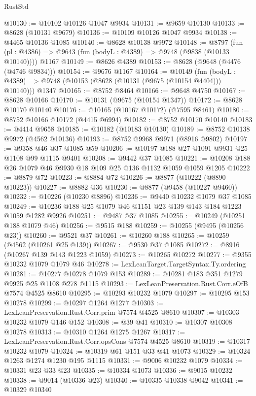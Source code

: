 \begin{lexlean}{RustStd}
\begin{coremodule}
@10130 := @10102 @10126 @1047 @9934
@10131 := @9659 @10130
@10133 := @8628 (@10131 @9679)
@10136 := @10109 @10126 @1047 @9934
@10138 := @4465 @10136 @1085
@10140 := @8628 @10138 @9972
@10148 := @8797
    (fun (pl : @4386) => @9643 (fun (bodyL : @4389) => @9748 (@9838 (@10133 @10140))))
    @1167
@10149 := @8626 @4389
@10153 := @8628 (@9648 (@4476 (@4746 @9834)))
@10154 := @9676 @1167
@10164 := @10149
    (fun (bodyL : @4389) => @9748 (@10153 (@8628 (@10131 (@9675 (@10154 @4404))) @10140)))
    @1347
@10165 := @8752 @8464
@10166 := @9648 @4750
@10167 := @8628 @10166
@10170 := @10131 (@9675 (@10154 @1347))
@10172 := @8628 @10170 @10140
@10176 := @10165 (@10167 @10172) (@7595 @8461)
@10180 := @8752 @10166 @10172 (@4415 @6994)
@10182 := @8752 @10170 @10140
@10183 := @4414 @9658
@10185 := @10182 (@10183 @10130)
@10189 := @8752 @10138 @9972 (@4562 @10136)
@10193 := @8752 @9968 @9971 (@8916 @9802)
@10197 := @9358 @46 @37 @1085 @59
@10206 := @10197 @188 @27 @1091 @9931 @25 @1108 @99 @1115 @9401
@10208 := @9442 @37 @1085
@10221 := @10208 @188 @26 @1079 @46 @9930 @18 @109 @25 @136 @1132 @1059 @1059 @1205
@10222 := @8879 @72
@10223 := @8884 @72
@10226 := @8877 (@10222 (@8890 @10223))
@10227 := @8882 @36
@10230 := @8877 (@9458 (@10227 @9460))
@10232 := @10226 (@10230 @8896)
@10236 := @9440 @10232 @1079 @37 @1085
@10249 := @10236 @188 @25 @1079 @46 @1151 @23 @139 @143 @184 @1223 @1059 @1282 @9926
@10251 := @9487 @37 @1085
@10255 := @10249 (@10251 @188 @1079 @46)
@10256 := @9515 @188
@10259 := @10255 (@9495 (@10256 @23))
@10260 := @9521 @37
@10261 := @10260 @188
@10265 := @10259 (@4562 (@10261 @25 @139))
@10267 := @9530 @37 @1085
@10272 := @8916 (@10267 @139 @143 @1223 @1059)
@10273 := @10265 @10272
@10277 := @9355 @10232 @1079 @1079 @46
@10278 := LexLeanTarget.TargetSyntax.Ty.ordering
@10281 := @10277 @10278 @1079 @153
@10289 := @10281 @183 @351 @1279 @9925 @25 @1108 @278 @1115
@10293 := LexLeanPreservation.Rust.Corr.eOfB @7574 @4525 @8610
@10295 := @10293 @10232 @1079
@10297 := @10295 @153 @10278
@10299 := @10297 @1264 @1277
@10303 := LexLeanPreservation.Rust.Corr.prim @7574 @4525 @8610
@10307 := @10303 @10232 @1079 @146 @152
@10308 := @39 @41
@10310 := @10307 @10308 @10278
@10313 := @10310 @1264 @1275 @1267
@10317 := LexLeanPreservation.Rust.Corr.opsCons @7574 @4525 @8610
@10319 := @10317 @10232 @1079
@10324 := @10319 @61 @151 @33 @41 @1073
@10329 := @10324 @1263 @1274 @1230 @195 @1115
@10331 := @9006 @10232 @1079
@10334 := @10331 @23 @33 @23
@10335 := @10334 @1073
@10336 := @9015 @10232
@10338 := @9014 (@10336 @23)
@10340 := @10335 @10338 @9042
@10341 := @10329 @10340

\end{coremodule}
\end{lexlean}

